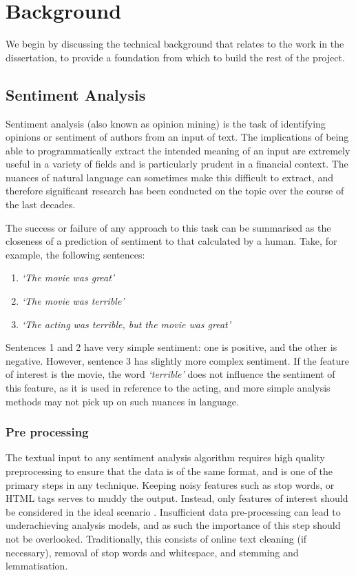 \chapter{Background}
\label{chap:technical}

We begin by discussing the technical background that relates to the work in the dissertation, to provide a foundation from which to build the rest of the project.

\section{Sentiment Analysis}
Sentiment analysis (also known as opinion mining) is the task of identifying opinions or sentiment of authors from an input of text. The implications of being able to programmatically extract the intended meaning of an input are extremely useful in a variety of fields and is particularly prudent in a financial context. The nuances of natural language can sometimes make this difficult to extract, and therefore significant research has been conducted on the topic over the course of the last decades.

The success or failure of any approach to this task can be summarised as the closeness of a prediction of sentiment to that calculated by a human. Take, for example, the following sentences:

\begin{enumerate}
\item \textit{`The movie was great'}
\item \textit{`The movie was terrible'}
\item \textit{`The acting was terrible, but the movie was great'}
\end{enumerate}

Sentences 1 and 2 have very simple sentiment: one is positive, and the other is negative. However, sentence 3 has slightly more complex sentiment. If the feature of interest is the movie, the word \textit{`terrible'} does not influence the sentiment of this feature, as it is used in reference to the acting, and more simple analysis methods may not pick up on such nuances in language.

\subsection{Pre processing}
The textual input to any sentiment analysis algorithm requires high quality preprocessing to ensure that the data is of the same format, and is one of the primary steps in any technique. Keeping noisy features such as stop words, or HTML tags serves to muddy the output. Instead, only features of interest should be considered in the ideal scenario \parencite{haddi2013preprocessing}. Insufficient data pre-processing can lead to underachieving analysis models, and as such the importance of this step should not be overlooked. Traditionally, this consists of online text cleaning (if necessary), removal of stop words and whitespace, and stemming and lemmatisation.

